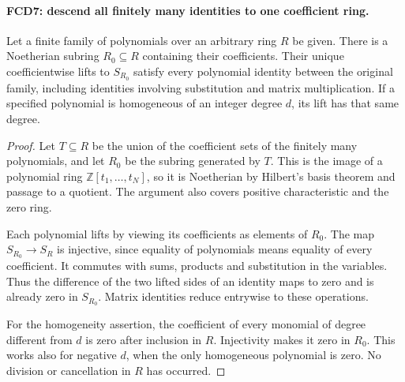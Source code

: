 \documentclass[11pt,a4paper]{article}
\numberwithin{equation}{section}
\theoremstyle{remark}\newtheorem{remark}[theorem]{Remark}
\begin{document}
\paragraph{FCD7: descend all finitely many identities to one coefficient ring.}
\label{claim:FCD7}
Let a finite family of polynomials over an arbitrary ring $R$ be given.
There is a Noetherian subring $R_0\subseteq R$ containing their
coefficients.  Their unique coefficientwise lifts to $S_{R_0}$
satisfy every polynomial identity between the original family,
including identities involving substitution and matrix multiplication.
If a specified polynomial is homogeneous of an integer degree $d$,
its lift has that same degree.

\begin{proof}
Let $T\subseteq R$ be the union of the coefficient sets of the
finitely many polynomials, and let $R_0$ be the subring generated
by $T$.  This is the image of a polynomial ring
$\mathbb Z[t_1,\ldots,t_N]$, so it is Noetherian by Hilbert's
basis theorem and passage to a quotient.  The argument also covers
positive characteristic and the zero ring.

Each polynomial lifts by viewing its coefficients as elements of
$R_0$.  The map $S_{R_0}\to S_R$ is injective, since equality
of polynomials means equality of every coefficient.  It commutes
with sums, products and substitution in the variables.  Thus the
difference of the two lifted sides of an identity maps to zero
and is already zero in $S_{R_0}$.  Matrix identities reduce
entrywise to these operations.

For the homogeneity assertion, the coefficient of every monomial
of degree different from $d$ is zero after inclusion in $R$.
Injectivity makes it zero in $R_0$.  This works also for negative
$d$, when the only homogeneous polynomial is zero.  No division
or cancellation in $R$ has occurred.
\end{proof}

\end{document}
